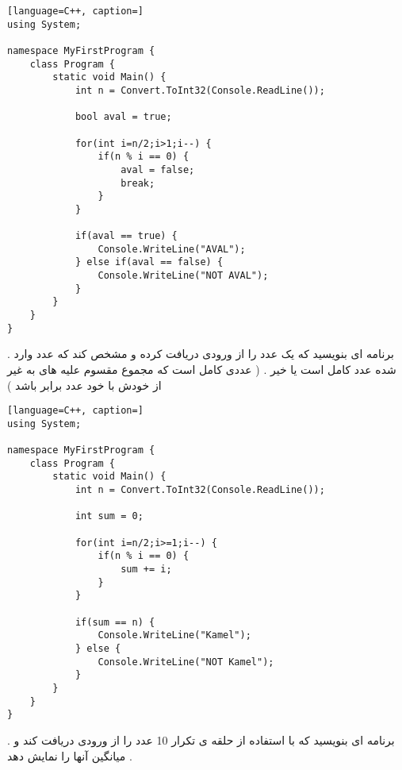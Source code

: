 \documentclass[12pt]{article}
\begin{document}
\begin{latin}
\begin{lstlisting}[language=C++, caption=]
using System;

namespace MyFirstProgram {
	class Program {
		static void Main() {
			int n = Convert.ToInt32(Console.ReadLine());
			
			bool aval = true;
			
			for(int i=n/2;i>1;i--) {
				if(n % i == 0) {
					aval = false;
					break;
				}
			}
			
			if(aval == true) {
				Console.WriteLine("AVAL");
			} else if(aval == false) {
				Console.WriteLine("NOT AVAL");
			}
		}
	}
}
\end{lstlisting}
\end{latin}









\newpage

 . برنامه ای بنویسید که یک عدد را از ورودی دریافت کرده و مشخص کند که عدد وارد شده عدد کامل است یا خیر . ( عددی کامل است که مجموع مقسوم علیه های به غیر از خودش با خود عدد برابر باشد )




\begin{latin}
\begin{lstlisting}[language=C++, caption=]
using System;

namespace MyFirstProgram {
	class Program {
		static void Main() {
			int n = Convert.ToInt32(Console.ReadLine());
			
			int sum = 0;
			
			for(int i=n/2;i>=1;i--) {
				if(n % i == 0) {
					sum += i;
				}
			}
			
			if(sum == n) {
				Console.WriteLine("Kamel");
			} else {
				Console.WriteLine("NOT Kamel");
			}
		}
	}
}
\end{lstlisting}
\end{latin}







\newpage

 . برنامه ای بنویسید که با استفاده از حلقه ی تکرار 10 عدد را از ورودی دریافت کند و میانگین آنها را نمایش دهد .
\end{document}
